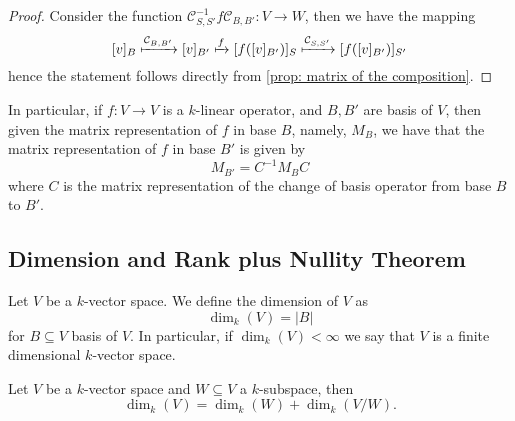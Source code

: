 \begin{proof}
  Consider the function \(\mathcal{C}_{S, S'}^{-1}  f  \mathcal{C}_{B,
  B'} : V \to W\), then we have the mapping
  \[
    [v]_B \xmapsto{\mathcal{C}_{B, B'}} [v]_{B'}
    \xmapsto f [f([v]_{B'})]_S
    \xmapsto{\mathcal{C}_{S, S'}} [f([v]_{B'})]_{S'}
  \]
  hence the statement follows directly from \cref{prop: matrix of the
  composition}.
\end{proof}

\begin{corollary}\label{cor: change of basis, linear operator}
  In particular, if \(f : V \to V\) is a \(k\)-linear operator, and \(B, B'\)
  are basis of \(V\), then given the matrix representation of \(f\) in base
  \(B\), namely, \(M_B\), we have that the matrix representation of \(f\) in
  base \(B'\) is given by
  \[
    M_{B'} = C^{-1} M_B C
  \]
  where \(C\) is the matrix representation of the change of basis operator from
  base \(B\) to \(B'\).
\end{corollary}

\subsection{Dimension and Rank plus Nullity Theorem}

\begin{definition}
  Let \(V\) be a \(k\)-vector space. We define the dimension of \(V\) as
  \[
    \dim_k(V) = |B|
  \]
  for \(B \subseteq V\) basis of \(V\). In particular, if \(\dim_k(V) < \infty\)
  we say that \(V\) is a finite dimensional \(k\)-vector space.
\end{definition}

\begin{lemma}\label{lem: rank plus nullity lemma}
  Let \(V\) be a \(k\)-vector space and \(W \subseteq V\) a \(k\)-subspace, then
  \[
    \dim_k(V) = \dim_k(W) + \dim_k(V/W).
  \]
\end{lemma}

